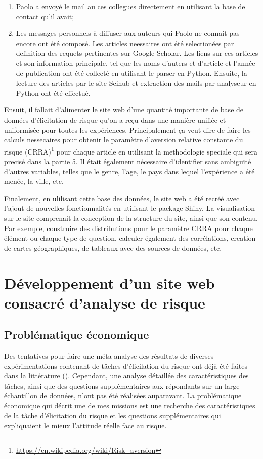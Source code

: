 \documentclass[12pt]{article}
\begin{document}
\begin{enumerate}
\item Paolo a envoyé le mail au ces collegues directement en utilisant la base de contact qu'il avait;
\item Les messages personnels à diffuser aux auteurs qui Paolo ne connait pas encore ont été composé. Les articles neessaires ont été selectionées par definition des requets pertinentes sur Google Scholar. Les liens sur ces articles et son information principale, tel que les noms d'auters et d'article et l'année de publication ont été collecté en utilisant le parser en Python. Ensuite, la lecture des articles par le site Scihub et extraction des mails par analyseur en Python ont été effectué. 
\end{enumerate}

Ensuit, il fallait d'alimenter le site web d'une quantité importante de
base de données d'élicitation de risque qu'on a reçu dans une manière
unifiée et uniformisée pour toutes les expériences. Principalement ça
veut dire de faire les calculs nessecaires pour obtenir le paramètre
d'aversion relative constante du risque (CRRA)\footnote{\url{https://en.wikipedia.org/wiki/Risk_aversion}}
pour chaque article en utilisant la methodologie speciale qui sera
precisé dans la partie 5. Il était également nécessaire d'identifier
sans ambiguïté d'autres variables, telles que le genre, l'age, le pays
dans lequel l'expérience a été menée, la ville, etc.

Finalement, en ulilisant cette base des données, le site web a été
recréé avec l'ajout de nouvelles fonctionnalités en utilisant le package
Shiny. La visualisation sur le site comprenait la conception de la
structure du site, ainsi que son contenu. Par exemple, construire des
distributions pour le paramètre CRRA pour chaque élément ou chaque type
de question, calculer également des corrélations, creation de cartes
géographiques, de tableaux avec des sources de données, etc.

\section{Développement d’un site web consacré d'analyse de risque}
\label{sec:fourth}

\subsection{Problématique économique}

Des tentatives pour faire une méta-analyse des résultats de diverses
expérimentations contenant de tâches d'élicilation du risque ont déjà
été faites dans la littérature (\citet{CroFil2013b}). Cependant, une
analyse détaillée des caractéristiques des tâches, ainsi que des
questions supplémentaires aux répondants sur un large échantillon de
données, n'ont pas été réalisées auparavant. La problématique économique
qui décrit une de mes missions est une recherche des caractéristiques de
la tâche d'élicitation du risque et les questions supplémentaires qui
expliquaient le mieux l'attitude réelle face au risque.
\end{document}
